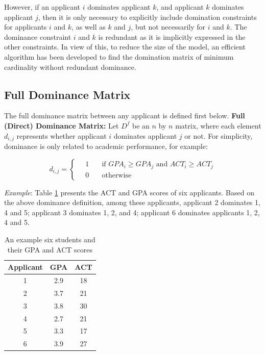\documentclass[12pt,english]{report}
\begin{document}
However, if an applicant $i$ dominates applicant $k$, and applicant $k$ dominates applicant $j$, then it is only necessary to explicitly include domination constraints for applicants $i$ and $k$, as well as $k$ and $j$, but not necessarily for $i$ and $k$. The dominance constraint $i$ and $k$ is redundant as it is implicitly expressed in the other constraints.  In view of this, to reduce the size of the model, an efficient algorithm has been developed to find the domination matrix of minimum cardinality  without redundant dominance.

\subsection{Full Dominance Matrix}
The full dominance matrix between any applicant is defined first below. \textbf{Full (Direct) Dominance Matrix:} Let $D^{f}$ be an $n$ by $n$ matrix, where each element $d_{i,j}$ represents whether applicant $i$ dominates applicant $j$ or not. For simplicity,  dominance is only related to academic performance, for example:

\begin{equation}
   d_{i,j} =
  \begin{cases}
\quad   1   & \quad \mbox{if }  GPA_i \geq GPA_j \mbox{ and }  ACT_i \geq ACT_j
\\
  \quad   0  & \quad \mbox{otherwise}
  \end{cases}   
\end{equation}

\vspace{0.15in}
\noindent \textit{Example}:  Table \ref{student_sample} presents the ACT and GPA scores of six applicants.  Based on the above dominance definition, among these applicants, applicant 2 dominates 1, 4 and 5; applicant 3 dominates 1, 2, and 4; applicant 6 dominates applicants 1, 2, 4 and 5.


\begin{table}[H]
\centering
\begin{tabular}{|c|c|c|}
\hline
  Applicant & GPA & ACT \\ [0.5ex] 
\hline
1 & 2.9 & 18 \\ \hline
2 & 3.7 & 21 \\ \hline
3 & 3.8 & 30 \\ \hline
4 & 2.7 & 21 \\ \hline
5 & 3.3 & 17 \\ \hline
6 & 3.9 & 27 \\ \hline
\end{tabular}
\caption{An example  six students and their GPA and ACT scores} 
\label{student_sample}
\end{table}
\end{document}
